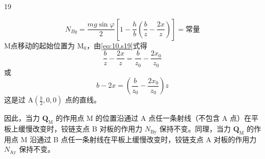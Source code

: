 \begin{solution}{19}
\begin{subsolution}
        \begin{equation}
            N_{By} = \frac{mg\sin\varphi}{2}\left[1 - \frac{h}{b}\left(\frac{b}{z} - \frac{2x}{z}\right)\right] = \text{常量}
            \label{eq:10.s19}
        \end{equation}
        M点移动的起始位置为 $\mathrm{M}_0$，由\eqref{eq:10.s19}式得
        \begin{equation}
            \frac{b}{z} - \frac{2x}{z} = \frac{b}{z_0} - \frac{2x_0}{z_0}
            \label{eq:11.s19}
        \end{equation}
        或
        \begin{equation}
            b - 2x = \left(\frac{b}{z_0} - \frac{2x_0}{z_0}\right)z
            \label{eq:12.s19}
        \end{equation}
        这是过 $\mathrm{A}(\frac{b}{2},0,0)$ 点的直线。

        因此，当力 $\boldsymbol{Q}_{\mathrm{M}}$ 的作用点 M 的位置沿通过 A 点任一条射线（不包含 A 点）在平板上缓慢改变时，铰链支点 B 对板的作用力 $N_{\mathrm{By}}$ 保持不变。同理，当力 $\boldsymbol{Q}_{\mathrm{M}}$ 的作用点 M 沿通过 B 点任一条射线在平板上缓慢改变时，铰链支点 A 对板的作用力 $N_{\mathrm{Ay}}$ 保持不变。
    \end{subsolution}
\end{solution}
